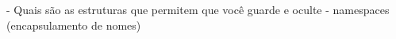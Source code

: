 - Quais são as estruturas que permitem que você guarde e oculte
- namespaces (encapsulamento de nomes)